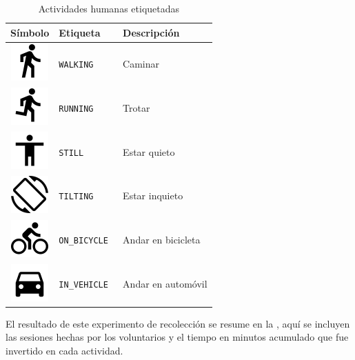 \begin{table}[h]
\begin{centering}
\begin{tabular}[t]{|c|l|l|}
\hline 
Símbolo & Etiqueta & Descripción\tabularnewline
\hline 
\hline 
\includegraphics[scale=0.5]{capitulo-6/graphics/ic_activity_walk} & \texttt{WALKING} & Caminar\tabularnewline
\hline 
\includegraphics[scale=0.5]{capitulo-6/graphics/ic_activity_run} & \texttt{RUNNING} & Trotar\tabularnewline
\hline 
\includegraphics[scale=0.5]{capitulo-6/graphics/ic_activity_still} & \texttt{STILL} & Estar quieto\tabularnewline
\hline 
\includegraphics[scale=0.5]{capitulo-6/graphics/ic_activity_tilt} & \texttt{TILTING} & Estar inquieto\tabularnewline
\hline 
\includegraphics[scale=0.5]{capitulo-6/graphics/ic_activity_bike} & \texttt{ON\_BICYCLE } & Andar en bicicleta\tabularnewline
\hline 
\includegraphics[scale=0.5]{capitulo-6/graphics/ic_activity_car} & \texttt{IN\_VEHICLE } & Andar en automóvil\tabularnewline
\hline 
\end{tabular}
\par\end{centering}
\caption{\label{tab6:etiquetas}Actividades humanas etiquetadas}
\end{table}

El resultado de este experimento de recolección se resume en la ,
aquí se incluyen las sesiones hechas por los voluntarios y el tiempo
en minutos acumulado que fue invertido en cada actividad. 

